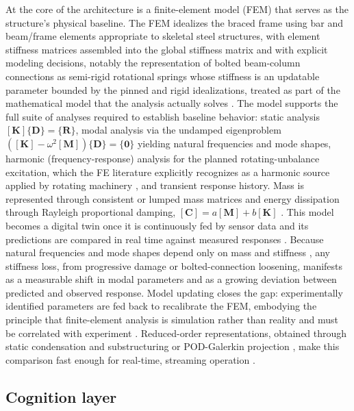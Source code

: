 At the core of the architecture is a finite-element model (FEM) that serves as the structure's physical baseline. The FEM idealizes the braced frame using bar and beam/frame elements appropriate to skeletal steel structures, with element stiffness matrices assembled into the global stiffness matrix and with explicit modeling decisions, notably the representation of bolted beam-column connections as semi-rigid rotational springs whose stiffness is an updatable parameter bounded by the pinned and rigid idealizations, treated as part of the mathematical model that the analysis actually solves \citep{cook2002fea}. The model supports the full suite of analyses required to establish baseline behavior: static analysis $[\mathbf{K}]\{\mathbf{D}\}=\{\mathbf{R}\}$, modal analysis via the undamped eigenproblem $([\mathbf{K}]-\omega^2[\mathbf{M}])\{\mathbf{D}\}=\{\mathbf{0}\}$ yielding natural frequencies and mode shapes, harmonic (frequency-response) analysis for the planned rotating-unbalance excitation, which the FE literature explicitly recognizes as a harmonic source applied by rotating machinery \citep{cook2002fea}, and transient response history. Mass is represented through consistent or lumped mass matrices and energy dissipation through Rayleigh proportional damping, $[\mathbf{C}]=a[\mathbf{M}]+b[\mathbf{K}]$ \citep{cook2002fea,chopra2017dynamics}. This model becomes a digital twin once it is continuously fed by sensor data and its predictions are compared in real time against measured responses \citep{chiachio2022structural,zou2026deep}. Because natural frequencies and mode shapes depend only on mass and stiffness \citep{chopra2017dynamics}, any stiffness loss, from progressive damage or bolted-connection loosening, manifests as a measurable shift in modal parameters and as a growing deviation between predicted and observed response. Model updating closes the gap: experimentally identified parameters are fed back to recalibrate the FEM, embodying the principle that finite-element analysis is simulation rather than reality and must be correlated with experiment \citep{cook2002fea}. Reduced-order representations, obtained through static condensation and substructuring \citep{cook2002fea} or POD-Galerkin projection \citep{brunton2019data}, make this comparison fast enough for real-time, streaming operation \citep{li2025edge}.

\subsection{Cognition layer}\label{subsec:cognition}

